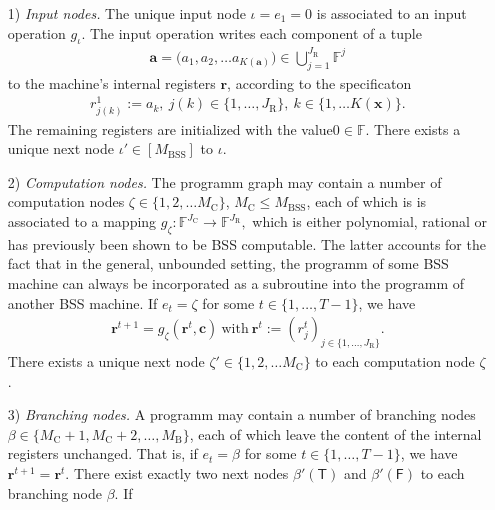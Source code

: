 \documentclass[conference]{IEEEtran}
\def\FF{{\mathbb F}}
\newcommand{\BSS}{\mathrm{BSS}}
\begin{document}
	\begin{itemize}	\item[1)] \emph{Input nodes.} The unique input node \(\iota = e_1 = 0\) is associated to an 
						input operation \(g_\iota\). The input operation writes each component of a tuple 
						\begin{align*} 	\bm{a} = \big(a_1,a_2,\ldots a_{K({\bm{a}})}\big) \in {\bigcup}_{j=1}^{J_{\mathrm{R}}} \FF^{j}
						\end{align*}
						to the machine's internal registers \(\bm{r}\), according to the specificaton
						\begin{align*}	r^1_{j(k)} := a_k ,~ j(k)\in \{1,\ldots,J_{\mathrm{R}}\},~ k\in \{1,\ldots K(\bm{x})\}.   
						\end{align*}
						The remaining registers are initialized with the value\linebreak \(0 \in \FF\).
						There exists a unique next node \(\iota' \in [M_\BSS]\) to \(\iota\).
					\item[2)] \emph{Computation nodes.} The programm graph may contain a number of computation nodes \(\zeta \in \{1,2,\ldots M_{\mathrm{C}}\}\),    
						\linebreak \(M_{\mathrm{C}} \leq M_{\BSS}\), each of which is 
						is associated to a mapping 
						\( 	g_\zeta : \FF^{J_{\mathrm{C}}}\rightarrow \FF^{J_{\mathrm{R}}}, 
						\) 
						which is either polynomial, rational or has previously been shown to be BSS computable. The latter accounts for the fact that in the general, 
						unbounded setting, the programm of some BSS machine can always be incorporated as a subroutine into the programm of another BSS machine.
						If \(e_t = \zeta\) for some \(t\in\{1,\ldots, T-1\}\), we have
						\begin{align*}  \bm{r}^{t+1} = g_{\zeta}(\bm{r}^t,\bm{c})~\text{with}~\bm{r}^t := (r_j^t)_{j\in\{1,\ldots,J_{\mathrm{R}}\}}.
						\end{align*}
						There exists a unique next node \(\zeta' \in \{1,2,\ldots M_{\mathrm{C}}\}\) to each computation node \(\zeta\).
					\item[3)] \emph{Branching nodes.}  A programm may contain a number of branching nodes \(\beta \in \{M_{\mathrm{C}} + 1, M_{\mathrm{C}} + 2,\ldots, M_\mathrm{B}\}\), 
						each of which leave the content of the internal registers unchanged. That is, if \(e_t = \beta\) for some \(t\in\{1,\ldots, T-1\}\), we have
						\(\bm{r}^{t+1} = \bm{r}^{t}\). There exist exactly two next nodes \(\beta'(\mathsf{T})\) and \(\beta'(\mathsf{F})\) to each branching node \(\beta\). If 

\end{itemize}
\end{document}
